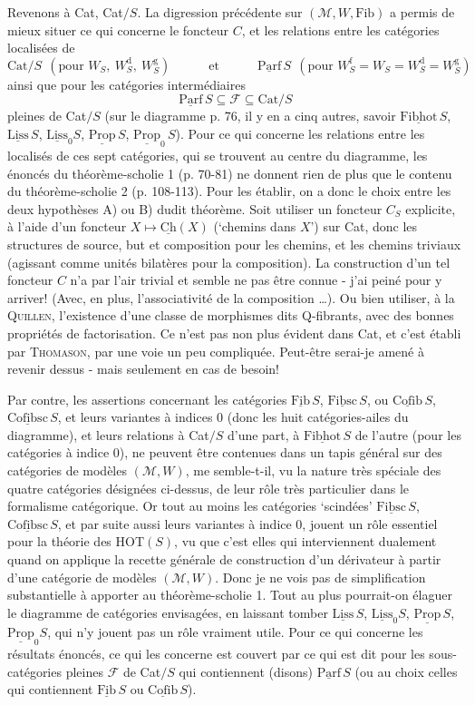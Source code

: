 \documentclass[11pt]{article}
\newcommand{\printedpage}[1]{\marginpar{\footnotesize p.~#1}}
\newcommand{\msp}[1]{\marginpar{\footnotesize [#1]}}
\newcommand{\Fib}{\underline{\mathrm{Fib}}\,}
\newcommand{\Fibsc}{\underline{\mathrm{Fibsc}}\,}
\newcommand{\Cofib}{\underline{\mathrm{Cofib}}\,}
\newcommand{\Cofibsc}{\underline{\mathrm{Cofibsc}}\,}
\newcommand{\Fibhot}{\underline{\mathrm{Fibhot}}\,}
\newcommand{\Parf}{\underline{\mathrm{Parf}}\,}
\newcommand{\Liss}{\underline{\mathrm{Liss}}}
\newcommand{\Prop}{\underline{\mathrm{Prop}}}
\newcommand{\Cat}{\mathrm{Cat}}
\newcommand{\M}{\mathcal{M}}
\begin{document}
Revenons à Cat, Cat$/S$. La digression précédente sur $(\M, W, \mathrm{Fib})$ a permis de mieux situer ce qui concerne le foncteur $C$, et les relations entre les catégories localisées de
\[\Cat/S \ \ (\text{pour } W_S,\ W_S^{\mathrm{d}},\ W_S^{\mathrm{g}}) \qquad\quad \text{et} \qquad\quad \Parf S \ \ (\text{pour } W_S^{\mathrm{f}} = W_S = W_S^{\mathrm{d}} = W_S^{\mathrm{g}})\]
ainsi que pour les catégories intermédiaires
\[\Parf S \subseteq \mathcal{F} \subseteq \Cat/S\]
pleines de Cat$/S$ (sur le diagramme p. 76, il y en a cinq autres, savoir $\Fibhot S$, $\Liss\,S$, $\Liss_0 S$, $\Prop\,S$, $\Prop_0\,S$). Pour ce qui concerne les relations entre les localisés de ces sept catégories, qui se trouvent au centre du diagramme, les énoncés du théorème-scholie 1 (p. 70-81) ne donnent rien de plus que le contenu du théorème-scholie 2 (p. 108-113). Pour les établir, on a donc le choix entre les deux hypothèses A) ou B) dudit théorème. Soit utiliser un foncteur $C_S$ explicite, à l'aide d'un
\msp{page 114}
foncteur $X \longmapsto \underline{\mathrm{Ch}}(X)$ (‘chemins dans $X$’) sur Cat, donc les structures de source, but et composition pour les chemins, et les chemins triviaux (agissant comme unités bilatères pour la composition). La construction d'un tel foncteur $C$ n'a par l'air trivial et semble ne pas être connue - j'ai peiné pour y arriver! (Avec, en plus, l'associativité de la composition \ldots). Ou bien utiliser, à la \textsc{Quillen}, l'existence d'une classe de morphismes dits Q-fibrants, avec des bonnes propriétés de factorisation. Ce n'est pas non plus évident dans Cat, et c'est établi par \textsc{Thomason}, par une voie un peu compliquée. Peut-être serai-je amené à revenir dessus - mais seulement en cas de besoin! %

Par contre, les assertions concernant les catégories $\Fib S$, $\Fibsc S$, ou $\Cofib S$, $\Cofibsc S$, et leurs variantes à indices 0 (donc les huit catégories-ailes du diagramme), et leurs relations à Cat$/S$ d'une part, à $\Fibhot S$ de l'autre (pour les catégories à indice 0), ne peuvent être contenues dans un tapis général sur des catégories de modèles $(\M, W)$, me semble-t-il, vu la nature très spéciale des quatre catégories désignées ci-dessus, de leur rôle très particulier dans le formalisme catégorique. Or tout au moins les catégories ‘scindées’ $\Fibsc S$, $\Cofibsc S$, et par suite aussi leurs variantes à indice 0, jouent un rôle essentiel pour la théorie des HOT$(S)$, vu que c'est elles qui
\msp{page 115}
interviennent dualement quand on applique la recette générale de construction d'un dérivateur à partir d'une catégorie de modèles $(\M, W)$. Donc je ne vois pas de simplification
\printedpage{72}
substantielle à apporter au théorème-scholie 1. Tout au plus pourrait-on élaguer le diagramme de catégories envisagées, en laissant tomber $\Liss\,S$, $\Liss_0 S$, $\Prop\,S$, $\Prop_0 S$, qui n'y jouent pas un rôle vraiment utile. Pour ce qui concerne les résultats énoncés, ce qui les concerne est couvert par ce qui est dit pour les sous-catégories pleines $\mathcal{F}$ de Cat$/S$ qui contiennent (disons) $\Parf S$ (ou au choix celles qui contiennent $\Fib S$ ou $\Cofib S$).
\end{document}
